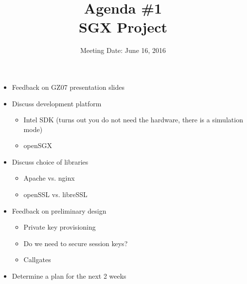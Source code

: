\documentclass{article}
\title{Agenda \#1 \\ SGX Project}
\date{Meeting Date: June 16, 2016}
\begin{document}
	\maketitle
	\begin{itemize}
		\item Feedback on GZ07 presentation slides
		\item Discuss development platform
		\begin{itemize}
			\item Intel SDK (turns out you do not need the hardware, there is a simulation mode)
			\item openSGX
		\end{itemize}
		\item Discuss choice of libraries
		\begin{itemize}
			\item Apache vs. nginx
			\item openSSL vs. libreSSL
		\end{itemize}
		\item Feedback on preliminary design 
		\begin{itemize}
			\item Private key provisioning 
			\item Do we need to secure session keys?
			\item Callgates
		\end{itemize}
		\item Determine a plan for the next 2 weeks
	\end{itemize}
\end{document}
